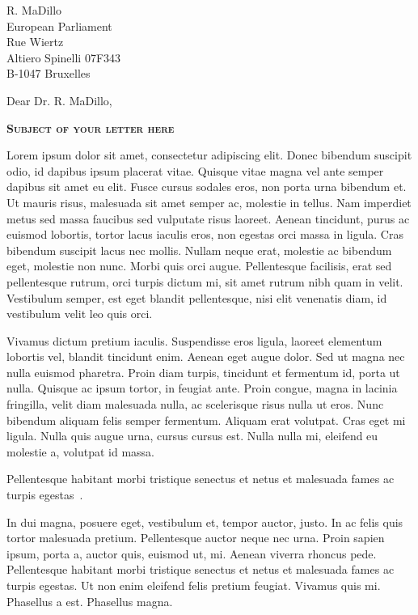\documentclass[a4paper,12pt]{letter}
\date{February 31, 2013}
\begin{document}
\begin{letter}{
    R. MaDillo\\
    European Parliament\\
    Rue Wiertz\\
    Altiero Spinelli 07F343\\
    B-1047 Bruxelles 
  }
  \opening{Dear Dr. R. MaDillo,}
%
  \begin{center}
    \textbf{\textsc{Subject of your letter here}}
  \end{center}
%
  Lorem ipsum dolor sit amet, consectetur adipiscing elit. Donec bibendum 
  suscipit odio, id dapibus ipsum placerat vitae. Quisque vitae magna vel ante 
  semper dapibus sit amet eu elit. Fusce cursus sodales eros, non porta urna 
  bibendum et. Ut mauris risus, malesuada sit amet semper ac, molestie in 
  tellus. Nam imperdiet metus sed massa faucibus sed vulputate risus laoreet. 
  Aenean tincidunt, purus ac euismod lobortis, tortor lacus iaculis eros, non 
  egestas orci massa in ligula. Cras bibendum suscipit lacus nec mollis. Nullam 
  neque erat, molestie ac bibendum eget, molestie non nunc. Morbi quis orci 
  augue. Pellentesque facilisis, erat sed pellentesque rutrum, orci turpis 
  dictum mi, sit amet rutrum nibh quam in velit. Vestibulum semper, est eget 
  blandit pellentesque, nisi elit venenatis diam, id vestibulum velit leo quis 
  orci. 
  
  Vivamus dictum pretium iaculis. Suspendisse eros ligula, laoreet elementum 
  lobortis vel, blandit tincidunt enim. Aenean eget augue dolor. Sed ut magna 
  nec nulla euismod pharetra. Proin diam turpis, tincidunt et fermentum id, 
  porta ut nulla. Quisque ac ipsum tortor, in feugiat ante. Proin congue, magna 
  in lacinia fringilla, velit diam malesuada nulla, ac scelerisque risus nulla 
  ut eros. Nunc bibendum aliquam felis semper fermentum. Aliquam erat volutpat. 
  Cras eget mi ligula. Nulla quis augue urna, cursus cursus est. Nulla nulla mi, 
  eleifend eu molestie a, volutpat id massa. 
  
  Pellentesque habitant morbi tristique senectus et netus et malesuada fames ac 
  turpis egestas~.

  In dui magna, posuere eget, vestibulum et, tempor auctor, justo. In ac felis 
  quis tortor malesuada pretium. Pellentesque auctor neque nec urna. Proin 
  sapien ipsum, porta a, auctor quis, euismod ut, mi. Aenean viverra rhoncus 
  pede. Pellentesque habitant morbi tristique senectus et netus et malesuada 
  fames ac turpis egestas. Ut non enim eleifend felis pretium feugiat. Vivamus 
  quis mi. Phasellus a est. Phasellus magna.


\end{letter}
\end{document}
